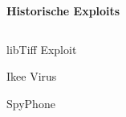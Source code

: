 \begin{frame}
	\centering
	\textbf{Historische Exploits}
	\begin{columns}[T] %
    	\begin{column}[T]{5cm} %
    		\begin{block}{}
				libTiff Exploit
			\end{block}
			\begin{block}{}
				Ikee Virus
			\end{block}
			\begin{block}{}
				SpyPhone
			\end{block}
    	\end{column}
	\end{columns}

\end{frame}